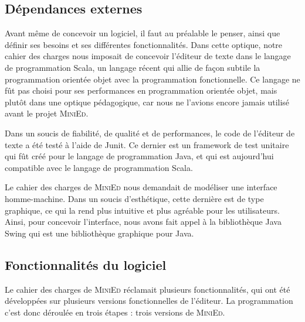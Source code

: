\documentclass[a4paper]{article}
\begin{document}
	\vspace{0.5cm}

		\subsection{Dépendances externes}

		\vspace{0.5cm}

		Avant même de concevoir un logiciel, il faut au préalable le penser, ainsi que définir ses besoins et ses différentes fonctionnalités. Dans cette optique, notre cahier des charges nous imposait de concevoir l’éditeur de texte dans le langage de programmation Scala, un langage récent qui allie de façon subtile la programmation orientée objet avec la programmation fonctionnelle. Ce langage ne fût pas choisi pour ses performances en programmation orientée objet, mais plutôt dans une optique pédagogique, car nous ne l'avions encore jamais utilisé avant le projet \textsc{MiniEd}.

		\vspace{0.5cm}

		Dans un soucis de fiabilité, de qualité et de performances, le code de l'éditeur de texte a été testé à l'aide de Junit. Ce dernier est un framework de test unitaire qui fût créé pour le langage de programmation Java, et qui est aujourd’hui compatible avec le langage de programmation Scala.

		\vspace{0.5cm}

		Le cahier des charges de \textsc{MiniEd} nous demandait de modéliser une interface homme-machine. Dans un soucis d'esthétique, cette dernière est de type graphique, ce qui la rend plus intuitive et plus agréable pour les utilisateurs. Ainsi, pour concevoir l'interface, nous avons fait appel à la bibliothèque Java Swing qui est une bibliothèque graphique pour Java.

		\vspace{0.5cm}

		\subsection{Fonctionnalités du logiciel}

		\vspace{0.5cm}

		Le cahier des charges de \textsc{MiniEd} réclamait plusieurs fonctionnalités, qui ont été développées sur plusieurs versions fonctionnelles de l'éditeur. La programmation c'est donc déroulée en trois étapes : trois versions de \textsc{MiniEd}.
\end{document}
